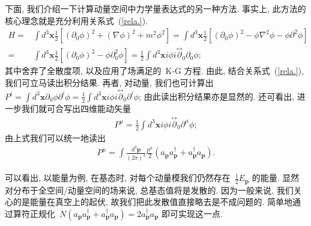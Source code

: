 下面, 我们介绍一下计算动量空间中力学量表达式的另一种方法. 事实上, 此方法的核心理念就是充分利用关系式~(\ref{rela.}).
\begin{align}
H=&\int d^3\bm{x}\frac{1}{2}\left[(\partial_0\phi)^2+(\nabla\phi)^2+m^2\phi^2\right]=\int d^3\bm{x}\frac{1}{2}\left[(\partial_0\phi)^2-\phi\nabla^2\phi-\phi\partial^2\phi\right]\nonumber\\
=&\int d^3\bm{x}\frac{1}{2}\left[(\partial_0\phi)^2-\phi\partial_0^2\phi\right]=\frac{1}{2}\int d^3\bm{x}i\phi i\overset{\leftrightarrow}{\partial}_0\partial_0\phi;
\end{align}
其中舍弃了全散度项, 以及应用了场满足的~K-G 方程. 由此, 结合关系式~(\ref{rela.}), 我们可立马读出积分结果. 再者, 对动量, 我们也可计算出~$P^i=\int d^3\bm{x}\partial_0\phi\partial^i\phi=\frac{1}{2}\int d^3\bm{x}i\phi i\overset{\leftrightarrow}{\partial}_0\partial^i\phi$; 由此读出积分结果亦是显然的. 还可看出, 进一步我们就可合写出四维能动矢量
\begin{align}
P^\mu=\frac{1}{2}\int d^3\bm{x}i\phi i\overset{\leftrightarrow}{\partial}_0\partial^\mu\phi;
\end{align}
由上式我们可以统一地读出
\begin{align}
P^\mu=\int \frac{d^3\bm{p}}{(2\pi)^3}\frac{p^\mu}{2}(a_{\bm{p}}a^\dag_{\bm{p}}+a^\dag_{\bm{p}}a_{\bm{p}}).
\end{align}







可以看出, 以能量为例, 在基态时, 对每个动量模我们仍然存在~$\frac{1}{2}E_{\bm{p}}$ 的能量. 显然对分布于全空间/动量空间的场来说, 总基态值将是发散的. %
因为一般来说, 我们关心的是能量在真空上的起伏, 故我们把此发散值直接略去是不成问题的. 简单地通过算符正规化~$N(a_{\bm{p}}a^\dag_{\bm{p}}+a^\dag_{\bm{p}}a_{\bm{p}})=2a^\dag_{\bm{p}}a_{\bm{p}}$ 即可实现这一点.






